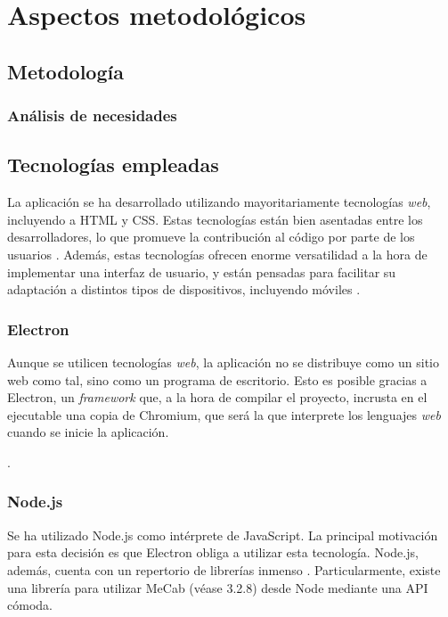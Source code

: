\chapter{Aspectos metodológicos}  

\section{Metodología}

\subsection{Análisis de necesidades}

\todo

\section{Tecnologías empleadas}

La aplicación se ha desarrollado utilizando mayoritariamente tecnologías \textit{web}, incluyendo a HTML y CSS. Estas tecnologías están bien asentadas entre los desarrolladores, lo que promueve la contribución al código por parte de los usuarios \autocite{7887704}. Además, estas tecnologías ofrecen enorme versatilidad a la hora de implementar una interfaz de usuario, y están pensadas para facilitar su adaptación a distintos tipos de dispositivos, incluyendo móviles \citationNeeded.

\subsection{Electron}

Aunque se utilicen tecnologías \textit{web}, la aplicación no se distribuye como un sitio web como tal, sino como un programa de escritorio. Esto es posible gracias a Electron, un \textit{framework} que, a la hora de compilar el proyecto, incrusta en el ejecutable una copia de Chromium, que será la que interprete los lenguajes \textit{web} cuando se inicie la aplicación. \autocite{Electron}

.

\subsection{Node.js}

Se ha utilizado Node.js como intérprete de JavaScript. La principal motivación para esta decisión es que Electron obliga a utilizar esta tecnología. Node.js, además, cuenta con un repertorio de librerías inmenso \todo. Particularmente, existe una librería para utilizar MeCab (véase 3.2.8) desde Node mediante una API cómoda.

